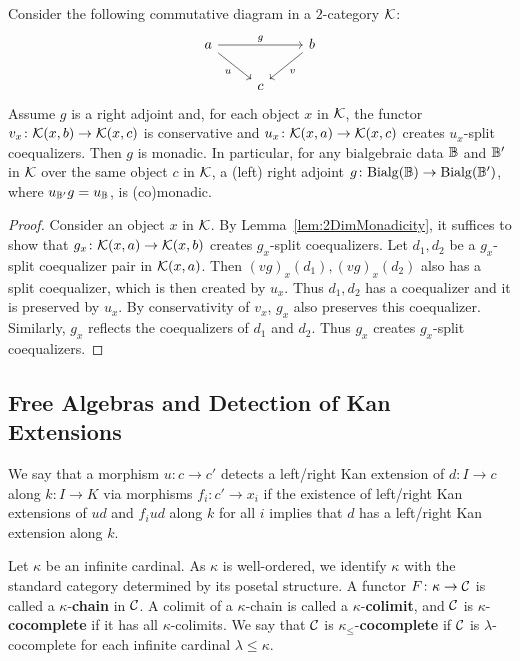 \begin{corollary}\label{cor:GeneralMonadicity}
    Consider the following commutative diagram in a $2$-category $\mathcal{K}$:
    $$
    \begin{tikzcd}
a \arrow[rd, "u"'] \arrow[rr, "g"] &   &b \arrow[ld, "v"] \\
                                       & c &                      
\end{tikzcd}
    $$
    Assume $g$ is a right adjoint and, for each object $x$ in $\mathcal{K}$, the functor $v_x\colon \mathcal{K}(x,b)\to\mathcal{K}(x,c)$ is conservative and $u_x\colon \mathcal{K}(x,a)\to\mathcal{K}(x,c)$ creates $u_x$-split coequalizers. Then $g$ is monadic. In particular, for any bialgebraic data $\mathbb{B}$ and $\mathbb{B}'$ in $\mathcal{K}$ over the same object $c$ in $\mathcal{K}$, a (left) right adjoint $g\colon \mathrm{Bialg}(\mathbb{B})\to \mathrm{Bialg}(\mathbb{B}')$, where $u_{\mathbb{B}'}g = u_{\mathbb{B}}$, is (co)monadic.
\end{corollary}
\begin{proof}
    Consider an object $x$ in $\mathcal{K}$. By Lemma~\ref{lem:2DimMonadicity}, it suffices to show that $g_x\colon \mathcal{K}(x,a)\to \mathcal{K}(x,b)$ creates $g_x$-split coequalizers. Let $d_1,d_2$ be a $g_x$-split coequalizer pair in $\mathcal{K}(x,a)$. Then $(vg)_x(d_1),(vg)_x(d_2)$ also has a split coequalizer, which is then created by $u_x$. Thus $d_1,d_2$ has a coequalizer and it is preserved by $u_x$. By conservativity of $v_x$, $g_x$ also preserves this coequalizer. Similarly, $g_x$ reflects the coequalizers of $d_1$ and $d_2$. Thus $g_x$ creates $g_x$-split coequalizers.
\end{proof}

\subsection{Free Algebras and Detection of Kan Extensions}
We say that a morphism $u\colon c\to c'$ detects a left/right Kan extension of $d\colon I\to c$ along $k\colon I\to K$ via morphisms $f_i\colon c'\to x_i$ if the existence of left/right Kan extensions of $ud$ and $f_iud$ along $k$ for all $i$ implies that $d$ has a left/right Kan extension along $k$.
\begin{definition}
    Let $\kappa$ be an infinite cardinal. As $\kappa$ is well-ordered, we identify $\kappa$ with the standard category determined by its posetal structure. A functor $F\colon\kappa\to \mathcal{C}$ is called a $\kappa$-\textbf{chain} in $\mathcal{C}$. A colimit of a $\kappa$-chain is called a $\kappa$-\textbf{colimit}, and $\mathcal{C}$ is $\kappa$-\textbf{cocomplete} if it has all $\kappa$-colimits. We say that $\mathcal{C}$ is $\kappa_\leq$-\textbf{cocomplete} if $\mathcal{C}$ is $\lambda$-cocomplete for each infinite cardinal $\lambda\leq \kappa$.
\end{definition}

